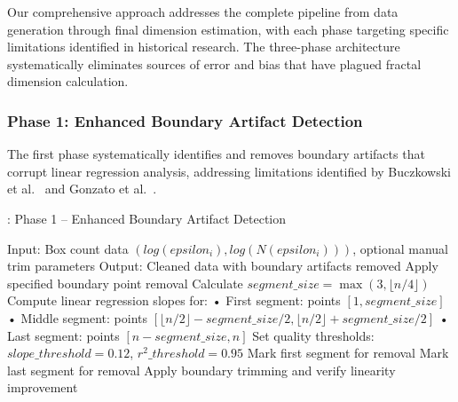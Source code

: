 \documentclass[preprint,12pt]{elsarticle}
\def\textbf#1{#1}%
\def\epsilon{epsilon}%
\begin{document}
Our comprehensive approach addresses the complete pipeline from data generation through final dimension estimation, with each phase targeting specific limitations identified in historical research. The three-phase architecture systematically eliminates sources of error and bias that have plagued fractal dimension calculation.

\subsubsection{Phase 1: Enhanced Boundary Artifact Detection}

The first phase systematically identifies and removes boundary artifacts that corrupt linear regression analysis, addressing limitations identified by Buczkowski et al.~\cite{buczkowski1998} and Gonzato et al.~\cite{gonzato1998}.

\begin{algorithm}[!htbp]
\caption{\textbf{: Phase 1} -- Enhanced Boundary Artifact Detection}
\label{alg:phase1}
\begin{algorithmic}[1]
\State \textbf{Input:} Box count data $(log(\epsilon_i), log(N(\epsilon_i)))$, optional manual trim parameters
\State \textbf{Output:} Cleaned data with boundary artifacts removed
\State
{}
    \State Apply specified boundary point removal
\EndIf
\State
{}
    \State Calculate $segment\_size = \max(3, \lfloor n/4 \rfloor)$
    \State Compute linear regression slopes for:
    \State \hspace{1em} • First segment: points $[1, segment\_size]$
    \State \hspace{1em} • Middle segment: points $[\lfloor n/2 \rfloor - segment\_size/2, \lfloor n/2 \rfloor + segment\_size/2]$
    \State \hspace{1em} • Last segment: points $[n - segment\_size, n]$
    \State
    \State Set quality thresholds: $slope\_threshold = 0.12$, $r^2\_threshold = 0.95$
    \State
        \State Mark first segment for removal
    \EndIf
        \State Mark last segment for removal
    \EndIf
    \State
    \State Apply boundary trimming and verify linearity improvement
\EndIf
\end{algorithmic}
\end{algorithm}
\end{document}

